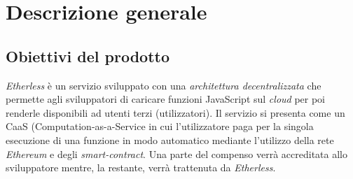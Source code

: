 \section{Descrizione generale}

\subsection{Obiettivi del prodotto}
\textit{Etherless} è un servizio sviluppato con una \textit{architettura decentralizzata\glo} che permette agli sviluppatori di caricare funzioni JavaScript sul \textit{cloud\glo} per poi renderle disponibili ad utenti terzi (utilizzatori). Il servizio si presenta come un CaaS (Computation-as-a-Service  in cui l’utilizzatore paga per la singola esecuzione di una funzione in modo automatico mediante l’utilizzo della rete \textit{Ethereum\glo} e degli \textit{smart-contract\glos}. Una parte del compenso verrà accreditata allo sviluppatore mentre, la restante, verrà trattenuta da \textit{Etherless}.

